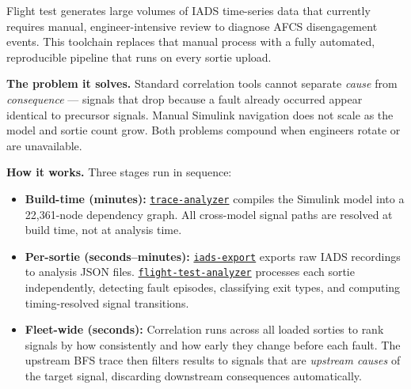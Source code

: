 \documentclass[11pt, letterpaper]{article}
\newcommand{\repoFTA}{\href{https://github.com/francis-barchesky/flight-test-analyzer}{\texttt{flight-test-analyzer}}}
\newcommand{\repoIADS}{\href{https://github.com/merlinlabs/iads-export}{\texttt{iads-export}}}
\newcommand{\repoTrace}{\href{https://github.com/francis-barchesky/trace-analyzer}{\texttt{trace-analyzer}}}
\begin{document}
\noindent Flight test generates large volumes of IADS time-series data that
currently requires manual, engineer-intensive review to diagnose AFCS
disengagement events. This toolchain replaces that manual process with a
fully automated, reproducible pipeline that runs on every sortie upload.

\medskip
\noindent\textbf{The problem it solves.}\quad
Standard correlation tools cannot separate \emph{cause} from
\emph{consequence} --- signals that drop because a fault already occurred
appear identical to precursor signals. Manual Simulink navigation does not scale
as the model and sortie count grow. Both problems compound when engineers
rotate or are unavailable.

\medskip
\noindent\textbf{How it works.} Three stages run in sequence:
\begin{itemize}[leftmargin=1.6em, itemsep=2pt, topsep=4pt]
  \item \textbf{Build-time (minutes):} \repoTrace{} compiles the Simulink model
    into a 22{,}361-node dependency graph. All cross-model signal paths are
    resolved at build time, not at analysis time.
  \item \textbf{Per-sortie (seconds--minutes):} \repoIADS{} exports raw IADS
    recordings to analysis JSON files. \repoFTA{} processes each sortie
    independently, detecting fault episodes, classifying exit types, and
    computing timing-resolved signal transitions.
  \item \textbf{Fleet-wide (seconds):} Correlation runs across all loaded
    sorties to rank signals by how consistently and how early they change
    before each fault. The upstream BFS trace then filters results to signals
    that are \emph{upstream causes} of the target signal, discarding
    downstream consequences automatically.
\end{itemize}
\end{document}
